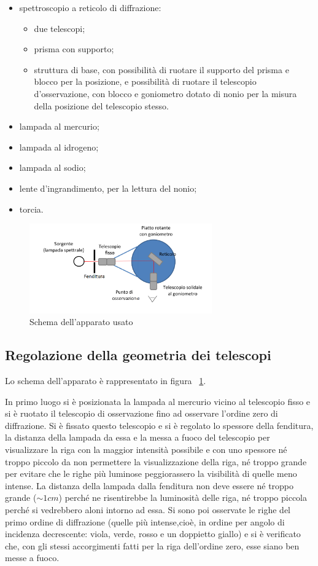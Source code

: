 \documentclass[a4paper,10pt]{article}
\begin{document}
{{{{{{\begin{itemize}
	\item spettroscopio a reticolo di diffrazione:
	\begin{itemize}
		\item due telescopi;
		\item prisma con supporto;
		\item struttura di base, con possibilità di ruotare il supporto del prisma e blocco per la posizione, e possibilità di ruotare il telescopio d'osservazione, con blocco e goniometro dotato di nonio per la misura della posizione del telescopio stesso.
	\end{itemize}
	\item lampada al mercurio;
	\item lampada al idrogeno;
	\item lampada al sodio;
	\item lente d'ingrandimento, per la lettura del nonio;
	\item torcia.
\end{itemize}

\begin{figure}[H]
	\centering
	\includegraphics[width=0.7\textwidth]{../grafici/Schema2.png}
	\caption{Schema dell'apparato usato}
	\label{fig:schema2}
\end{figure}

\subsection{Regolazione della geometria dei telescopi}
Lo schema dell'apparato è rappresentato in figura \figurename{~\ref{fig:schema2}}.

In primo luogo si è posizionata la lampada al mercurio vicino al telescopio fisso e si è ruotato il telescopio di osservazione fino ad osservare l'ordine zero di diffrazione. Si è fissato questo telescopio e si è regolato lo spessore della fenditura, la distanza della lampada da essa e la messa a fuoco del telescopio per visualizzare la riga con la maggior intensità possibile e con uno spessore né troppo piccolo da non permettere la visualizzazione della riga, né troppo grande per evitare che le righe più luminose peggiorassero la visibilità di quelle meno intense. La distanza della lampada dalla fenditura non deve essere né troppo grande ($\sim 1 cm$) perché ne risentirebbe la luminosità delle riga, né troppo piccola perché si vedrebbero aloni intorno ad essa.
Si sono poi osservate le righe del primo ordine di diffrazione (quelle più intense,cioè, in ordine per angolo di incidenza decrescente: viola, verde, rosso e un doppietto giallo) e si è verificato che, con gli stessi accorgimenti fatti per la riga dell'ordine zero, esse siano ben messe a fuoco.

}}}}}}
\end{document}
